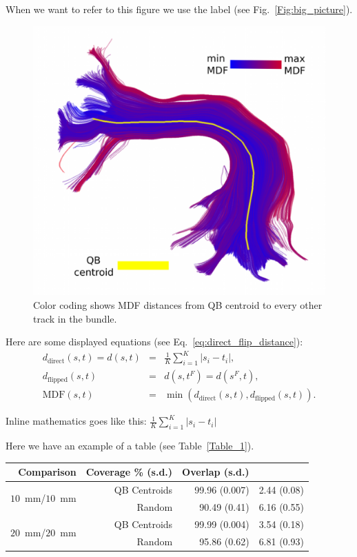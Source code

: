 \documentclass{bioinfo}
\begin{document}
When we want to refer to this figure we use the label (see Fig.~\ref{Fig:big_picture}).

\begin{figure}
\includegraphics[scale=0.15]{Figures/Fig_11_MDF_arcuate}
\centering{}
\caption{Color coding shows MDF distances from QB centroid to every
  other track in the bundle.\label{Fig:little_picture}}
\end{figure}

Here are some displayed equations (see Eq.~\ref{eq:direct_flip_distance}):
\begin{eqnarray}
  d_{\textrm{direct}}(s, t) = d(s, t) & = & \frac{1}{K}\sum_{i=1}^{K}|s_{i}-t_{i}|,\nonumber\\
  d_{\textrm{flipped}}(s, t) & = & d(s,t^F) = d(s^F,t),\nonumber\\
  \textrm{MDF}(s, t) & = & \min(d_{\textrm{direct}}(s, t), d_{\textrm{flipped}}(s, t))\label{eq:direct_flip_distance}.
\end{eqnarray}

Inline mathematics goes like this: $\frac{1}{K}\sum_{i=1}^{K}|s_{i}-t_{i}|$

Here we have an example of a table (see Table~\ref{Table_1}).

\begin{table}[th]  {\begin{tabular}{rrrr} %
Comparison & Coverage \% (s.d.) & Overlap (s.d.) \\ \hline
\multirow{2}{*}{$10$~mm/$10$~mm} & QB Centroids & 99.96 (0.007) & 2.44
(0.08)\\ & Random & 90.49 (0.41) & 6.16 (0.55)\\ \hline
\multirow{2}{*}{$20$~mm/$20$~mm} & QB Centroids & 99.99 (0.004) & 3.54
(0.18)\\ & Random & 95.86 (0.62) & 6.81 (0.93)\\ \hline
\end{tabular}}{}
\end{table}
\end{document}
